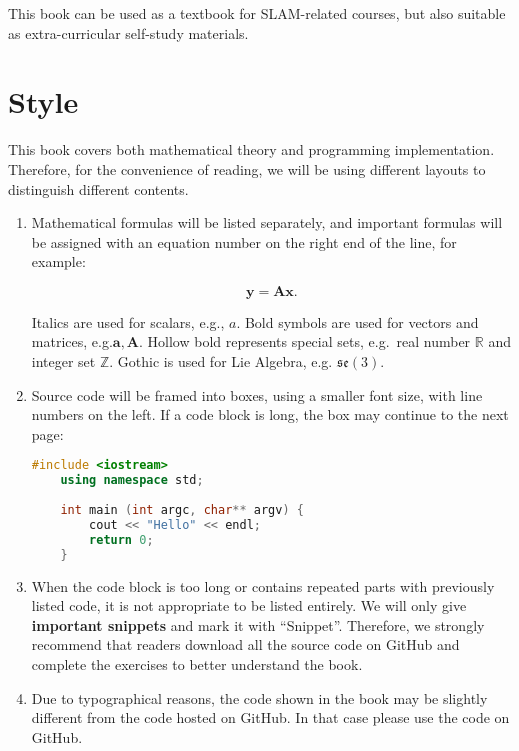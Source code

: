 This book can be used as a textbook for SLAM-related courses, but also suitable as extra-curricular self-study materials.

\section{Style}

This book covers both mathematical theory and programming implementation. Therefore, for the convenience of reading, we will be using different layouts to distinguish different contents.

\begin{enumerate}
	\item Mathematical formulas will be listed separately, and important formulas will be assigned with an equation number on the right end of the line, for example:
	
	\begin{equation}
	\mathbf{y} =\mathbf{A}\mathbf{x}.
	\end{equation}
	
	Italics are used for scalars, e.g., $a$. Bold symbols are used for vectors and matrices, e.g.$\mathbf{a}, \mathbf{A}$. Hollow bold represents special sets, e.g.\ real number $\mathbb{R}$ and integer set $\mathbb{Z}$. Gothic is used for Lie Algebra, e.g. $\mathfrak{se}(3)$.
	
	\item Source code will be framed into boxes, using a smaller font size, with line numbers on the left. If a code block is long, the box may continue to the next page:
	\begin{lstlisting}[language=C++]
	#include <iostream>
	using namespace std;
	
	int main (int argc, char** argv) {
		cout << "Hello" << endl;
		return 0;
	}
	\end{lstlisting}
	
	\item When the code block is too long or contains repeated parts with previously listed code, it is not appropriate to be listed entirely. We will only give \textbf{important snippets} and mark it with ``Snippet''. Therefore, we strongly recommend that readers download all the source code on GitHub and complete the exercises to better understand the book.
	
	\item Due to typographical reasons, the code shown in the book may be slightly different from the code hosted on GitHub. In that case please use the code on GitHub.
	

\end{enumerate}

